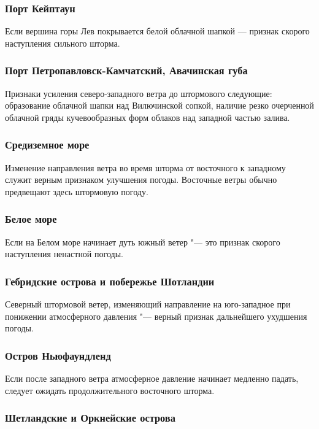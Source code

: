 \subsubsection{Порт Кейптаун}

Если вершина горы Лев покрывается белой облачной шапкой — признак
скорого наступления сильного шторма.

\subsubsection{Порт Петропавловск-Камчатский, Авачинская губа}

Признаки усиления северо-западного ветра до штормового следующие:
образование облачной шапки над Вилючинской сопкой, наличие резко
очерченной облачной гряды кучевообразных форм облаков над западной
частью залива.

\subsubsection{Средиземное море}

Изменение направления ветра во время шторма от восточного к западному
служит верным признаком улучшения погоды. Восточные ветры обычно
предвещают здесь штормовую погоду.

\subsubsection{Белое море}

Если на Белом море начинает дуть южный ветер "--- это признак скорого
наступления ненастной погоды.

\subsubsection{Гебридские острова и побережье Шотландии}

Северный штормовой ветер, изменяющий направление на юго-западное при
понижении атмосферного давления "--- верный признак дальнейшего
ухудшения погоды.

\subsubsection{Остров Ньюфаундленд}

Если после западного ветра атмосферное давление начинает медленно
падать, следует ожидать продолжительного восточного шторма.

\subsubsection{Шетландские и Оркнейские острова}

